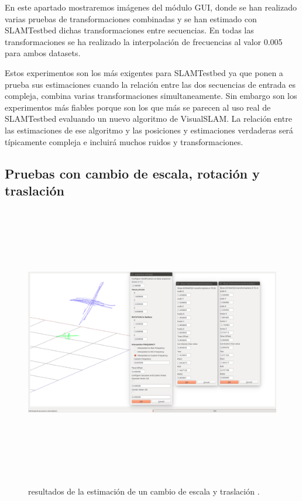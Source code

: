En este apartado mostraremos imágenes del módulo GUI, donde se han realizado varias pruebas de transformaciones combinadas y se han estimado con SLAMTestbed dichas transformaciones entre secuencias.
En todas las transformaciones se ha realizado la interpolación de frecuencias al valor 0.005 para ambos datasets.

Estos experimentos son los más exigentes para SLAMTestbed ya que ponen a prueba sus estimaciones cuando la relación entre las dos secuencias de entrada es compleja, combina varias transformaciones simultaneamente. Sin embargo son los experimentos más fiables porque son los que más se parecen al uso real de SLAMTestbed evaluando un nuevo algoritmo de VisualSLAM. La relación entre las estimaciones de ese algoritmo y las posiciones y estimaciones verdaderas será típicamente compleja e incluirá muchos ruidos y transformaciones.

\subsection{Pruebas con cambio de escala, rotación y traslación}
\begin{figure}[h]
\begin{center}
\label{fig:opciones de View}\includegraphics[height=12.0cm,width=18.0cm]{img/cap6/Escala_Trasla_Rota_abba.png}
\hspace{0.5cm}

\end{center}

\caption{ resultados de la estimación de un cambio de escala y traslación .}
\end{figure}

